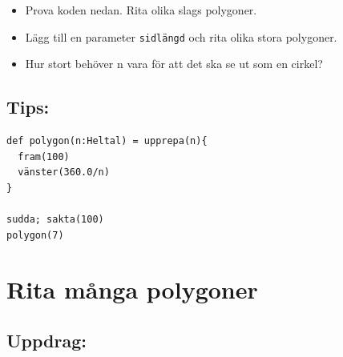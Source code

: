 \begin{itemize}

\item {Prova koden nedan. Rita olika slags polygoner.}
\item {Lägg till en parameter \lstinline{sidlängd} och rita olika stora polygoner.}
\item {Hur stort behöver n vara för att det ska se ut som en cirkel?}

\end{itemize}


\section*{\color{OliveGreen}Tips:}

\begin{lstlisting}[basicstyle={\ttfamily\fontsize{18}{22}\selectfont},numbers=none]
def polygon(n:Heltal) = upprepa(n){
  fram(100)
  vänster(360.0/n)
}

sudda; sakta(100)
polygon(7)
\end{lstlisting}
        

  
\chapter{Rita många polygoner}\section*{\color{BrickRed}Uppdrag:}


